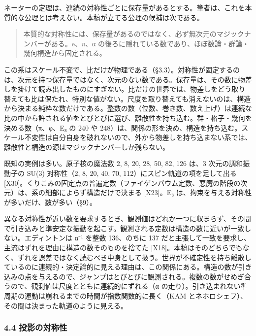 \documentclass[
  a4paper,
]{ltjsarticle}
\begin{document}
ネーターの定理は、連続の対称性ごとに保存量があるとする。筆者は、これを本質的な公理とは考えない。本稿が立てる公理の候補は次である。

\begin{quote}
本質的な対称性には、保存量があるのではなく、必ず無次元のマジックナンバーがある。e、π、α
の後ろに隠れている数であり、ほぼ数論・群論・幾何構造から固定される。
\end{quote}

この系はスケール不変で、比だけが物理である（§3.3）。対称性が固定するのは、次元を持つ保存量ではなく、次元のない数である。保存量は、その数に物差しを掛けて読み出したものにすぎない。比だけの世界では、物差しをどう取り替えても比は保たれ、特別な値がない。尺度を取り替えても消えないのは、構造から決まる純粋な数だけである。整数の数（位数、巻き数、数え上げ）は連続な比の中から許される値をとびとびに選び、離散性を持ち込む。群・格子・幾何を決める数（π、φ、E₈
の 240 や
248）は、関係の形を決め、構造を持ち込む。スケール不変性は自分自身を破れないので、外から物差しを持ち込まない系では、離散性と構造の源はマジックナンバーしか残らない。

既知の実例は多い。原子核の魔法数 2, 8, 20, 28, 50, 82, 126 は、3
次元の調和振動子の SU(3) 対称性（2, 8, 20, 40, 70,
112）にスピン軌道の項を足して出る
{[}X30{]}。くりこみの固定点の普遍定数（ファイゲンバウム定数、悪魔の階段の次元）は、系の細部によらず構造だけで決まる
{[}X23{]}。E₈ は、拘束を与える対称性が多いだけ、数が多い（§9）。

異なる対称性が近い数を要求するとき、観測値はどれか一つに収まらず、その間で引き込みと準安定な振動を起こす。観測される定数は構造の数に近いが一致しない。エディントンは
α⁻¹ を整数 136、のちに 137
だと主張して一致を要求し、主流はずれを理由に構造の数そのものを捨てた
{[}X18{]}。本稿はそのどちらでもなく、ずれを誤差ではなく読むべき中身として扱う。世界が不確定性を持ち離散しているのに連続的・決定論的に見える理由は、この関係にある。構造の数が引き込みの点を与えるので、ジャンプはとびとびに観測される。複数の数がせめぎ合うので、観測値は尺度とともに連続的にずれる（α
の走り）。引き込まれない準周期の運動は崩れるまでの時間が指数関数的に長く（KAM
とネホロシェフ）、その間は決まった軌道のように見える。

\subsubsection{4.4
投影の対称性}\label{ux6295ux5f71ux306eux5bfeux79f0ux6027}
\end{document}
